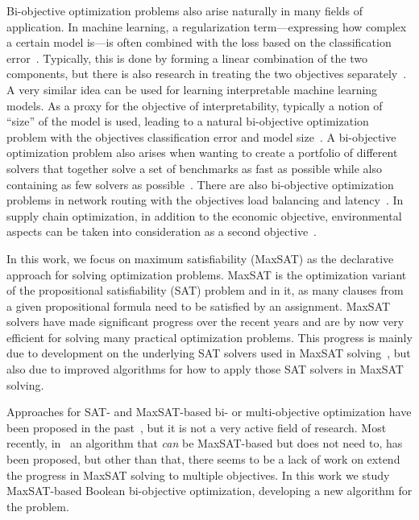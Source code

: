 Bi-objective optimization problems also arise naturally in many fields of application.
In machine learning, a regularization term---expressing how complex a certain model is---is often combined with the loss based on the classification error~\autocite{}.
Typically, this is done by forming a linear combination of the two components, but there is also research in treating the two objectives separately~\autocite{DBLP:journals/tsmc/JinS08}.
A very similar idea can be used for learning interpretable machine learning models.
As a proxy for the objective of interpretability, typically a notion of ``size'' of the model is used, leading to a natural bi-objective optimization problem with the objectives classification error and model size~\autocites{DBLP:conf/ijcai/Ignatiev0NS21,DBLP:conf/cp/MaliotovM18,DBLP:conf/ijcai/NarodytskaIPM18,DBLP:conf/ijcai/Hu0HH20,DBLP:conf/cp/YuISB20,DBLP:conf/aaai/Ignatiev0S021}.
A bi-objective optimization problem also arises when wanting to create a portfolio of different solvers that together solve a set of benchmarks as fast as possible while also containing as few solvers as possible~\autocite{DBLP:conf/cp/JanotaMSM21}.
There are also bi-objective optimization problems in network routing with the objectives load balancing and latency~\autocite{SilverioEtAl2022biobjectiveoptimization}.
In supply chain optimization, in addition to the economic objective, environmental aspects can be taken into consideration as a second objective~\autocite{DBLP:journals/cce/Pinto-VarelaBN11}.

In this work, we focus on maximum satisfiability (MaxSAT) as the declarative approach for solving optimization problems.
MaxSAT is the optimization variant of the propositional satisfiability (SAT) problem and in it, as many clauses from a given propositional formula need to be satisfied by an assignment.
MaxSAT solvers have made significant progress over the recent years and are by now very efficient for solving many practical optimization problems.
This progress is mainly due to development on the underlying SAT solvers used in MaxSAT solving~\autocite{}, but also due to improved algorithms for how to apply those SAT solvers in MaxSAT solving.

Approaches for SAT- and MaxSAT-based bi- or multi-objective optimization have been proposed in the past~\autocites{DBLP:conf/cp/SohBTB17,DBLP:conf/ijcai/Terra-NevesLM18a,DBLP:conf/aaai/Terra-NevesLM18,DBLP:conf/ijcai/Terra-NevesLM18}, but it is not a very active field of research.
Most recently, in~\textcite{DBLP:conf/cp/JanotaMSM21} an algorithm that \emph{can} be MaxSAT-based but does not need to, has been proposed, but other than that, there seems to be a lack of work on extend the progress in MaxSAT solving to multiple objectives.
In this work we study MaxSAT-based Boolean bi-objective optimization, developing a new algorithm for the problem.

